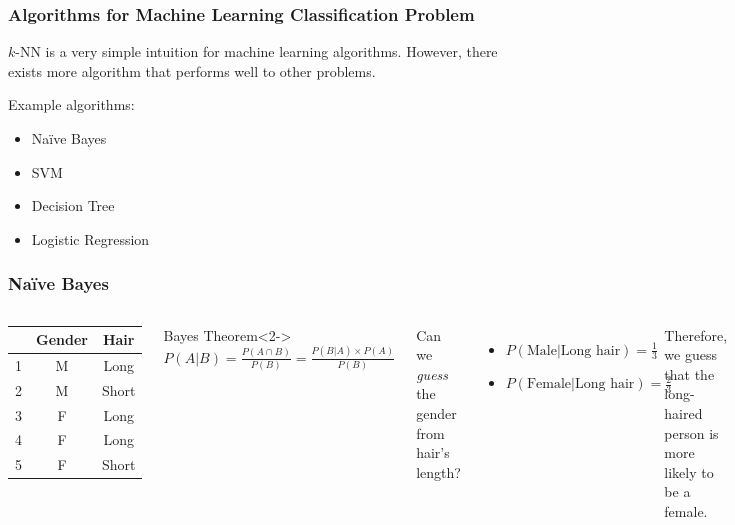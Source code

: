 \documentclass[aspectratio=169]{beamer}
\begin{document}
\begin{frame}
	\frametitle{Algorithms for Machine Learning Classification Problem}
	 $k$-NN is a very simple intuition for machine learning algorithms. However, there exists more algorithm that performs well to other problems.

	 Example algorithms:
	\begin{itemize}
		\item<4-> Na\"{i}ve Bayes
		\item<5-> SVM
		\item<6-> Decision Tree
		\item<7-> Logistic Regression
	\end{itemize}
\end{frame}

\begin{frame}
	\frametitle{Na\"ive Bayes}
	\begin{columns}
		\begin{center}
			\begin{tabular}{|c | c c |}
				\hline
				  & Gender & Hair  \\ [0.5ex]
				\hline\hline
				1 & M      & Long  \\
				\hline
				2 & M      & Short \\
				\hline
				3 & F      & Long  \\
				\hline
				4 & F      & Long  \\
				\hline
				5 & F      & Short \\ [1ex]
				\hline
			\end{tabular}
		\end{center}
		\begin{block}{Bayes Theorem}<2->
			$P(A|B) = \frac{P(A \cap B)}{P(B)} = \frac{P(B|A) \times P(A)}{P(B)}$
		\end{block}
		Can we \textit{guess} the gender from hair's length?
		\begin{itemize}
			\item<4-> $P(\textrm{Male}|\textrm{Long hair}) = \frac{1}{3}$
			\item<5-> $P(\textrm{Female}|\textrm{Long hair}) = \frac{2}{3}$
		\end{itemize}
		 Therefore, we guess that the long-haired person is more likely to be a female.
	\end{columns}
\end{frame}
\end{document}
